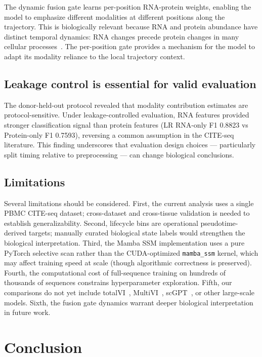 \documentclass[11pt,twocolumn]{article}
\begin{document}
The dynamic fusion gate learns per-position RNA-protein weights, enabling the model to emphasize different modalities at different positions along the trajectory. This is biologically relevant because RNA and protein abundance have distinct temporal dynamics: RNA changes precede protein changes in many cellular processes~\citep{stoeckius2017}. The per-position gate provides a mechanism for the model to adapt its modality reliance to the local trajectory context.

\subsection{Leakage control is essential for valid evaluation}

The donor-held-out protocol revealed that modality contribution estimates are protocol-sensitive. Under leakage-controlled evaluation, RNA features provided stronger classification signal than protein features (LR RNA-only F1 0.8823 vs Protein-only F1 0.7593), reversing a common assumption in the CITE-seq literature. This finding underscores that evaluation design choices — particularly split timing relative to preprocessing — can change biological conclusions.

\subsection{Limitations}

Several limitations should be considered. First, the current analysis uses a single PBMC CITE-seq dataset; cross-dataset and cross-tissue validation is needed to establish generalizability. Second, lifecycle bins are operational pseudotime-derived targets; manually curated biological state labels would strengthen the biological interpretation. Third, the Mamba SSM implementation uses a pure PyTorch selective scan rather than the CUDA-optimized \texttt{mamba\_ssm} kernel, which may affect training speed at scale (though algorithmic correctness is preserved). Fourth, the computational cost of full-sequence training on hundreds of thousands of sequences constrains hyperparameter exploration. Fifth, our comparisons do not yet include totalVI~\citep{gayoso2021}, MultiVI~\citep{Ashuach2023MultiVI}, scGPT~\citep{cui2024}, or other large-scale models. Sixth, the fusion gate dynamics warrant deeper biological interpretation in future work.

\section{Conclusion}
\end{document}
